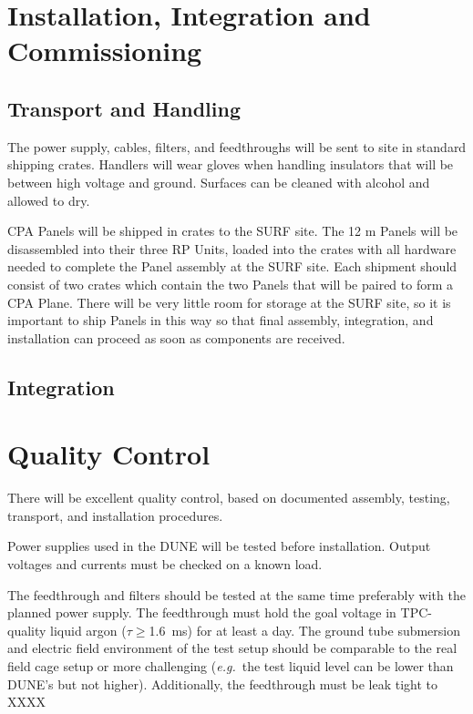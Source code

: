 \section{Installation, Integration and Commissioning}
\label{sec:fdsp-hv-install}

\subsection{Transport and Handling}
\label{sec:fdsp-hv-install-transport}

The power supply, cables, filters, and feedthroughs will be sent to site in standard shipping crates.  Handlers will wear gloves when handling insulators that will be between high voltage and ground.  Surfaces can be cleaned with alcohol and allowed to dry.

CPA Panels will be shipped in crates to the SURF site.  The 12 m Panels will be disassembled into their three RP Units, loaded into the crates with all hardware needed to complete the Panel assembly at the SURF site.  Each shipment should consist of two crates which contain the two Panels that will be paired to form a CPA Plane.  There will be very little room for storage at the SURF site, so it is important to ship Panels in this way so that final assembly, integration, and installation can proceed as soon as components are received.

\subsection{Integration }
\label{sec:fdsp-hv-install-pds-elec}

\section{Quality Control}
There will be excellent quality control, based on documented assembly, testing, transport, and installation procedures.
\label{sec:fdsp-hv-qc}

Power supplies used in the DUNE will be tested before installation.  Output voltages and currents must be checked on a known load. 

The feedthrough and filters should be tested at the same time preferably with the planned power supply.  The feedthrough must hold the goal  voltage in TPC-quality liquid argon ($\tau\geq$\SI{1.6}{ms}) for at least a day.  The ground tube submersion and electric field environment of the test setup should be comparable to the real field cage setup or more challenging ({\it e.g.}\ the test liquid level can be lower than DUNE's but not higher).  Additionally, the feedthrough must be leak tight to XXXX 


